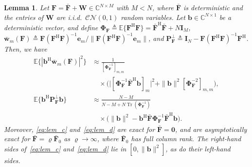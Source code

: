 \documentclass[journal]{IEEEtran}
\newtheorem{lemma}{Lemma}
\newcommand{\E}{\mathbb{E}}
\newcommand{\CN}{\mathcal{CN}}
\newcommand{\tr}{\operatorname{Tr}}
\newcommand{\bI}{\mathbf{I}}
\newcommand{\wb}{\bar{\mathbf{w}}}
\newcommand{\be}{\mathbf{e}}
\newcommand{\bb}{\mathbf{b}}
\newcommand{\bF}{\mathbf{F}}
\newcommand{\Fb}{\bar{\mathbf{F}}}
\newcommand{\bW}{\mathbf{W}}
\newcommand{\bPhi}{\boldsymbol{\Phi}}
\begin{document}
\begin{lemma}\label{lem:det}
Let $\bF=\Fb+\bW\in\mathbb C^{N\times M}$ with $M<N$, where $\Fb$ is deterministic and the entries of $\bW$ are i.i.d.\ $\CN(0,1)$ random variables. Let $\bb\in\mathbb C^{N\times1}$ be a deterministic vector, and define $\bPhi_{\bF}\triangleq\E\{\bF^{\mathrm{H}}\bF\}=\Fb^{\mathrm{H}}\Fb+N\bI_M$, $\wb_m(\bF)\triangleq\bF(\bF^{\mathrm{H}}\bF)^{-1}\be_m/\|\bF(\bF^{\mathrm{H}}\bF)^{-1}\be_m\|$, and $\mathbf P_{\bF}^\perp\triangleq\bI_N-\bF(\bF^{\mathrm{H}}\bF)^{-1}\bF^{\mathrm{H}}$. Then, we have
\begin{align}
\E\{|\bb^{\mathrm{H}}\wb_m(\bF)|^2\}
&\approx\frac{1}{[\bPhi_{\bF}^{-1}]_{m,m}}
\nonumber\\
&\quad\times\Big(
 \big|[\bPhi_{\bF}^{-1}\Fb^{\mathrm{H}}\bb]_m\big|^2
 +\|\bb\|^2[\bPhi_{\bF}^{-2}]_{m,m}\Big),
\label{eq:lem_c}\\
\E\{\bb^{\mathrm{H}}\mathbf P_{\bF}^{\perp}\bb\}
&\approx\frac{N-M}
 {N-M+N\tr(\bPhi_{\bF}^{-1})}
\nonumber\\
&\quad\times\big(
 \|\bb\|^2-\bb^{\mathrm{H}}\Fb\bPhi_{\bF}^{-1}\Fb^{\mathrm{H}}\bb\big).
\label{eq:lem_d}
\end{align}
Moreover, \eqref{eq:lem_c} and~\eqref{eq:lem_d} are exact for $\Fb=\mathbf 0$, and are asymptotically exact for $\Fb=\varrho\Fb_0$ as $\varrho\to\infty$, where $\Fb_0$ has full column rank. The right-hand sides of~\eqref{eq:lem_c} and~\eqref{eq:lem_d} lie in $[0,\|\bb\|^2]$, as do their left-hand sides.
\end{lemma}
\end{document}
